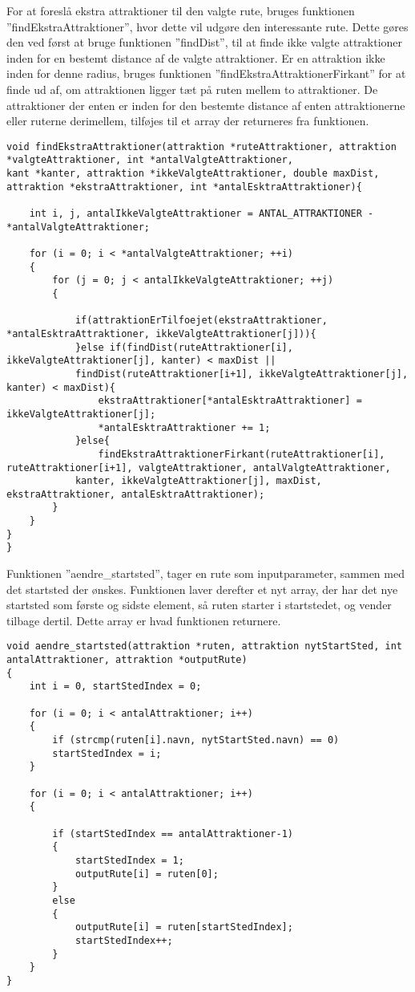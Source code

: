 For at foreslå ekstra attraktioner til den valgte rute, bruges funktionen ”findEkstraAttraktioner”, hvor dette vil udgøre den interessante rute. Dette gøres den ved først at bruge funktionen ”findDist”, til at finde ikke valgte attraktioner inden for en bestemt distance af de valgte attraktioner. Er en attraktion ikke inden for denne radius, bruges funktionen ”findEkstraAttraktionerFirkant” for at finde ud af, om attraktionen ligger tæt på ruten mellem to attraktioner. De attraktioner der enten er inden for den bestemte distance af enten attraktionerne eller ruterne derimellem, tilføjes til et array der returneres fra funktionen.

\begin{lstlisting}
void findEkstraAttraktioner(attraktion *ruteAttraktioner, attraktion *valgteAttraktioner, int *antalValgteAttraktioner, 
kant *kanter, attraktion *ikkeValgteAttraktioner, double maxDist, attraktion *ekstraAttraktioner, int *antalEsktraAttraktioner){
	
	int i, j, antalIkkeValgteAttraktioner = ANTAL_ATTRAKTIONER - *antalValgteAttraktioner;
	
	for (i = 0; i < *antalValgteAttraktioner; ++i)
	{
		for (j = 0; j < antalIkkeValgteAttraktioner; ++j)
		{
			
			if(attraktionErTilfoejet(ekstraAttraktioner, *antalEsktraAttraktioner, ikkeValgteAttraktioner[j])){
			}else if(findDist(ruteAttraktioner[i], ikkeValgteAttraktioner[j], kanter) < maxDist || 
			findDist(ruteAttraktioner[i+1], ikkeValgteAttraktioner[j], kanter) < maxDist){
				ekstraAttraktioner[*antalEsktraAttraktioner] = ikkeValgteAttraktioner[j];
				*antalEsktraAttraktioner += 1;
			}else{
				findEkstraAttraktionerFirkant(ruteAttraktioner[i], ruteAttraktioner[i+1], valgteAttraktioner, antalValgteAttraktioner,
			kanter, ikkeValgteAttraktioner[j], maxDist, ekstraAttraktioner, antalEsktraAttraktioner);
		}
	}
}
}
\end{lstlisting}

Funktionen ”aendre\_startsted”, tager en rute som inputparameter, sammen med det startsted der ønskes. Funktionen laver derefter et nyt array, der har det nye startsted som første og sidste element, så ruten starter i startstedet, og vender tilbage dertil. Dette array er hvad funktionen returnere. 

\begin{lstlisting}
void aendre_startsted(attraktion *ruten, attraktion nytStartSted, int antalAttraktioner, attraktion *outputRute)
{
	int i = 0, startStedIndex = 0;
	
	for (i = 0; i < antalAttraktioner; i++)
	{
		if (strcmp(ruten[i].navn, nytStartSted.navn) == 0)
		startStedIndex = i;
	}
	
	for (i = 0; i < antalAttraktioner; i++)
	{
		
		if (startStedIndex == antalAttraktioner-1)
		{
			startStedIndex = 1;
			outputRute[i] = ruten[0];
		}
		else
		{
			outputRute[i] = ruten[startStedIndex];
			startStedIndex++;
		}
	}
}
\end{lstlisting}